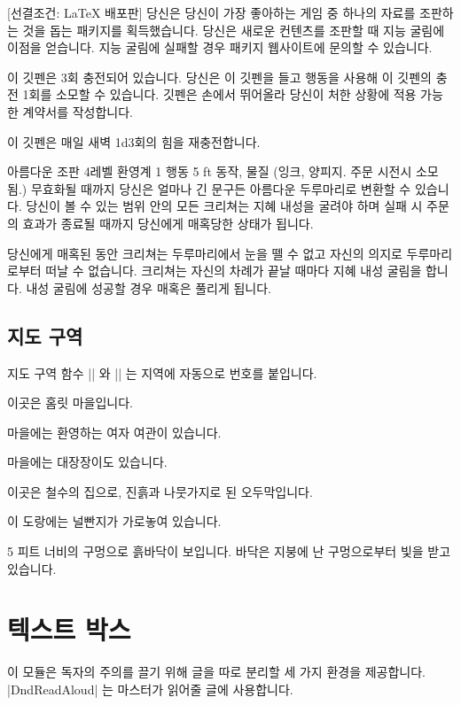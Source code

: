 \documentclass[letterpaper,twocolumn,openany,nodeprecatedcode]{dndbook}
\begin{document}
[선결조건: \LaTeX{} 배포판]
당신은 당신이 가장 좋아하는 게임 중 하나의 자료를 조판하는 것을 돕는 패키지를 획득했습니다. 당신은 새로운 컨텐츠를 조판할 때 지능 굴림에 이점을 얻습니다. 지능 굴림에 실패할 경우 패키지 웹사이트에 문의할 수 있습니다.


이 깃펜은 3회 충전되어 있습니다. 당신은 이 깃펜을 들고 행동을 사용해 이 깃펜의 충전 1회를 소모할 수 있습니다. 깃펜은 손에서 뛰어올라 당신이 처한 상황에 적용 가능한 계약서를 작성합니다.

이 깃펜은 매일 새벽 1d3회의 힘을 재충전합니다.

\DndSpellHeader%
  {아름다운 조판}
  {4레벨 환영계}
  {1 행동}
  {5 ft}
  {동작, 물질 (잉크, 양피지. 주문 시전시 소모됨.)}
  {무효화될 때까지}
당신은 얼마나 긴 문구든 아름다운 두루마리로 변환할 수 있습니다. 당신이 볼 수 있는 범위 안의 모든 크리쳐는 지혜 내성을 굴려야 하며 실패 시 주문의 효과가 종료될 때까지 당신에게 매혹당한 상태가 됩니다.

당신에게 매혹된 동안 크리쳐는 두루마리에서 눈을 뗄 수 없고 자신의 의지로 두루마리로부터 떠날 수 없습니다. 크리쳐는 자신의 차례가 끝날 때마다 지혜 내성 굴림을 합니다. 내성 굴림에 성공할 경우 매혹은 풀리게 됩니다.

\section{지도 구역}
지도 구역 함수 |\DndArea| 와 |\DndSubArea| 는 지역에 자동으로 번호를 붙입니다.

이곳은 홈릿 마을입니다.

마을에는 환영하는 여자 여관이 있습니다.

마을에는 대장장이도 있습니다.

이곳은 철수의 집으로, 진흙과 나뭇가지로 된 오두막입니다.

이 도랑에는 널빤지가 가로놓여 있습니다.

5 피트 너비의 구멍으로 흙바닥이 보입니다. 바닥은 지붕에 난 구멍으로부터 빛을 받고 있습니다.

\chapter{텍스트 박스}

이 모듈은 독자의 주의를 끌기 위해 글을 따로 분리할 세 가지 환경을 제공합니다. |DndReadAloud| 는 마스터가 읽어줄 글에 사용합니다.
\end{document}
